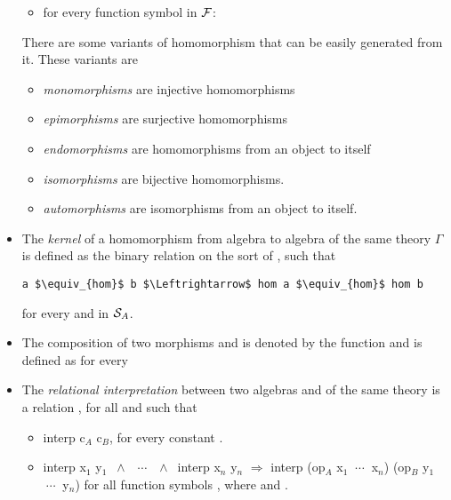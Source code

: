 \begin{itemize}
\begin{itemize}
        \item for every function symbol in $\mathcal{F}$: 
    \end{itemize}
    There are some variants of homomorphism that can be easily generated from it. These variants are  
    \begin{itemize}
    	\item \emph{monomorphisms} are injective homomorphisms 
  	  	\item \emph{epimorphisms} are surjective homomorphisms 
    	\item \emph{endomorphisms} are homomorphisms from an object to itself 
    	\item \emph{isomorphisms} are bijective homomorphisms. 
    	\item \emph{automorphisms} are isomorphisms from an object to itself. 
    \end{itemize}
    \item The \emph{kernel} of a homomorphism from algebra  to algebra  of the same theory $\Gamma$ is defined as the binary relation  on the sort of , such that 
    \begin{lstlisting}[mathescape] 
    a $\equiv_{hom}$ b $\Leftrightarrow$ hom a $\equiv_{hom}$ hom b
    \end{lstlisting}
    for every  and  in $\mathcal{S}_A$. 
    \item The composition of two morphisms  and  is denoted by the function  and is defined as 
     for every    
    \item The \emph{relational interpretation} between two algebras  and  of the same theory is a relation , for all  and  such that 
    \begin{itemize}
    \item interp c$_A$ c$_B$, for every constant .  
    \item interp x$_1$ y$_1$ $\ \wedge\ $ $\ \cdots\ $ $\ \wedge\ $ interp x$_n$ y$_n$ $\Rightarrow$ interp (op$_A$ x$_1$ $\ \cdots\ $ x$_n$) (op$_B$ y$_1$ $\ \cdots\ $ y$_n$) for all function symbols , where  and . 
    \end{itemize}
    

\end{itemize}
